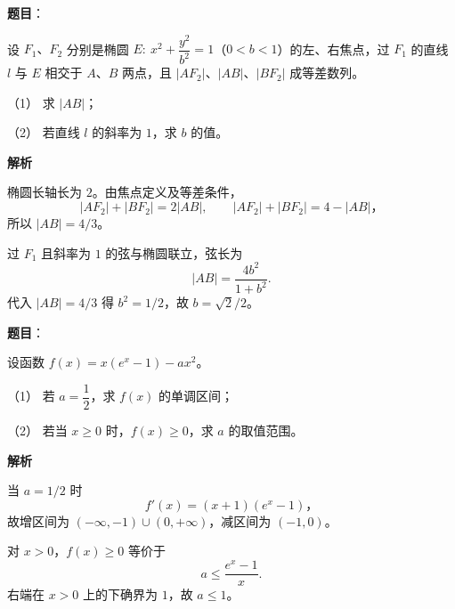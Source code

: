 \begin{answer}

\textbf{题目}：

设 $F_1\text{、}F_2$ 分别是椭圆 $E:\ x^2+\dfrac{y^2}{b^2}=1$（$0<b<1$）的左、右焦点，过 $F_1$ 的直线 $l$ 与 $E$ 相交于 $A\text{、}B$ 两点，且 $|AF_2|\text{、}|AB|\text{、}|BF_2|$ 成等差数列。

（1） 求 $|AB|$；

（2） 若直线 $l$ 的斜率为 $1$，求 $b$ 的值。

\textbf{解析}


椭圆长轴长为 $2$。由焦点定义及等差条件，
\nopagebreak[4]
\[
|AF_2|+|BF_2|=2|AB|,
\qquad |AF_2|+|BF_2|=4-|AB|\text{，}
\]
所以 $|AB|=4/3$。


过 $F_1$ 且斜率为 $1$ 的弦与椭圆联立，弦长为
\nopagebreak[4]
\[
|AB|=\frac{4b^2}{1+b^2}.
\]
代入 $|AB|=4/3$ 得 $b^2=1/2$，故 $b=\sqrt2/2$。



\end{answer}
\begin{answer}

\textbf{题目}：

设函数 $f(x)=x(e^x-1)-ax^2$。

（1） 若 $a=\dfrac12$，求 $f(x)$ 的单调区间；

（2） 若当 $x\geq0$ 时，$f(x)\geq0$，求 $a$ 的取值范围。

\textbf{解析}


当 $a=1/2$ 时
\nopagebreak[4]
\[
f'(x)=(x+1)(e^x-1)\text{，}
\]
故增区间为 $(-\infty,-1)\cup(0,+\infty)$，减区间为 $(-1,0)$。


对 $x>0$，$f(x)\geq0$ 等价于
\nopagebreak[4]
\[
a\leq\frac{e^x-1}{x}.
\]
右端在 $x>0$ 上的下确界为 $1$，故 $a\leq1$。



\end{answer}
